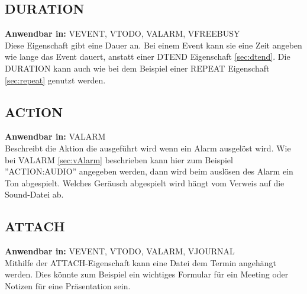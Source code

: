 \subsection{DURATION}
\label{sec:duration}
\textbf{Anwendbar in:} VEVENT, VTODO, VALARM, VFREEBUSY\\
Diese Eigenschaft gibt eine Dauer an. Bei einem Event kann sie eine Zeit angeben wie lange das Event dauert, anstatt einer DTEND Eigenschaft \ref{sec:dtend}. Die DURATION kann auch wie bei dem Beispiel einer REPEAT Eigenschaft \ref{sec:repeat} genutzt werden.
\subsection{ACTION}
\label{sec:action}
\textbf{Anwendbar in:} VALARM \\
Beschreibt die Aktion die ausgeführt wird wenn ein Alarm ausgelöst wird. Wie bei VALARM \ref{sec:vAlarm} beschrieben kann hier zum Beispiel ''ACTION:AUDIO'' angegeben werden, dann wird beim auslösen des Alarm ein Ton abgespielt. Welches Geräusch abgespielt wird hängt vom Verweis auf die Sound-Datei ab. 
\subsection{ATTACH}
\label{sec:attach}
\textbf{Anwendbar in:} VEVENT, VTODO, VALARM, VJOURNAL\\
Mithilfe der ATTACH-Eigenschaft kann eine Datei dem Termin angehängt werden. Dies könnte zum Beispiel ein wichtiges Formular für ein Meeting oder Notizen für eine Präsentation sein. 